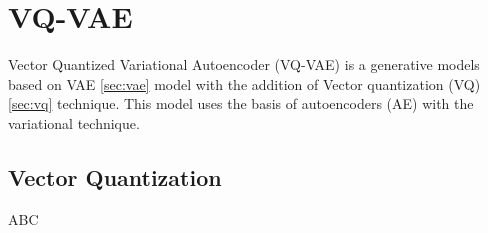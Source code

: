 \section{VQ-VAE}
\label{sec:vqvae}

Vector Quantized Variational Autoencoder (VQ-VAE) \cite{vqvae} is a generative models based on VAE \ref{sec:vae} model with the addition of Vector quantization (VQ) \ref{sec:vq} technique. This model uses the basis of autoencoders (AE) with the variational technique. 

\subsection{Vector Quantization}
\label{vq}

ABC